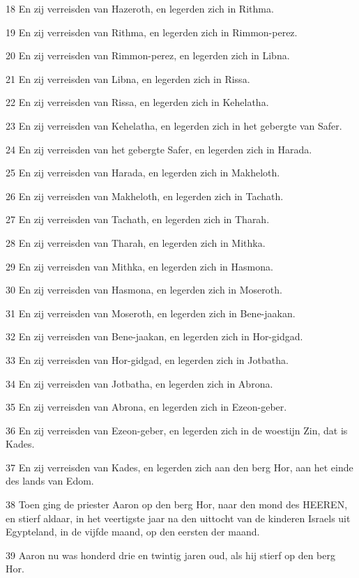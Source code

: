 \par 18 En zij verreisden van Hazeroth, en legerden zich in Rithma.
\par 19 En zij verreisden van Rithma, en legerden zich in Rimmon-perez.
\par 20 En zij verreisden van Rimmon-perez, en legerden zich in Libna.
\par 21 En zij verreisden van Libna, en legerden zich in Rissa.
\par 22 En zij verreisden van Rissa, en legerden zich in Kehelatha.
\par 23 En zij verreisden van Kehelatha, en legerden zich in het gebergte van Safer.
\par 24 En zij verreisden van het gebergte Safer, en legerden zich in Harada.
\par 25 En zij verreisden van Harada, en legerden zich in Makheloth.
\par 26 En zij verreisden van Makheloth, en legerden zich in Tachath.
\par 27 En zij verreisden van Tachath, en legerden zich in Tharah.
\par 28 En zij verreisden van Tharah, en legerden zich in Mithka.
\par 29 En zij verreisden van Mithka, en legerden zich in Hasmona.
\par 30 En zij verreisden van Hasmona, en legerden zich in Moseroth.
\par 31 En zij verreisden van Moseroth, en legerden zich in Bene-jaakan.
\par 32 En zij verreisden van Bene-jaakan, en legerden zich in Hor-gidgad.
\par 33 En zij verreisden van Hor-gidgad, en legerden zich in Jotbatha.
\par 34 En zij verreisden van Jotbatha, en legerden zich in Abrona.
\par 35 En zij verreisden van Abrona, en legerden zich in Ezeon-geber.
\par 36 En zij verreisden van Ezeon-geber, en legerden zich in de woestijn Zin, dat is Kades.
\par 37 En zij verreisden van Kades, en legerden zich aan den berg Hor, aan het einde des lands van Edom.
\par 38 Toen ging de priester Aaron op den berg Hor, naar den mond des HEEREN, en stierf aldaar, in het veertigste jaar na den uittocht van de kinderen Israels uit Egypteland, in de vijfde maand, op den eersten der maand.
\par 39 Aaron nu was honderd drie en twintig jaren oud, als hij stierf op den berg Hor.
